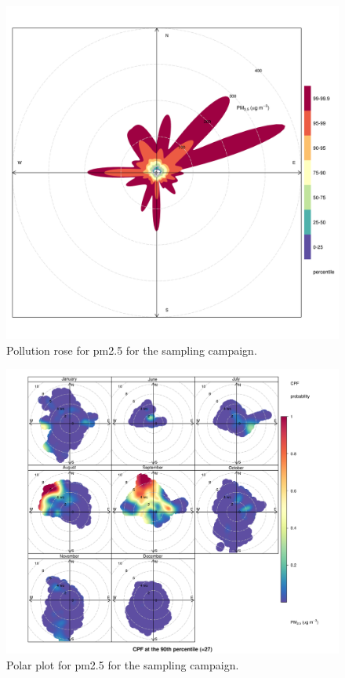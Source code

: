 \documentclass{nwureport}
\begin{document}
\begin{figure}[!htb]
    \centering
    \includegraphics[width=\textwidth]{images/Wedela_PM2-5_percentileRose.png}
    \caption[Pollution rose for $PM_{2.5}$ for the sampling campaign.]{Pollution rose for \gls{pm2.5} for the sampling campaign.}
    \label{fig:summary}
\end{figure}

\begin{figure}[!htb]
    \centering
    \includegraphics[width=\textwidth]{images/Wedela_PM2-5_polar.png}
    \caption[Polar plot for $PM_{2.5}$ for the sampling campaign.]{Polar plot for \gls{pm2.5} for the sampling campaign.}
    \label{fig:summary}
\end{figure}
\end{document}

